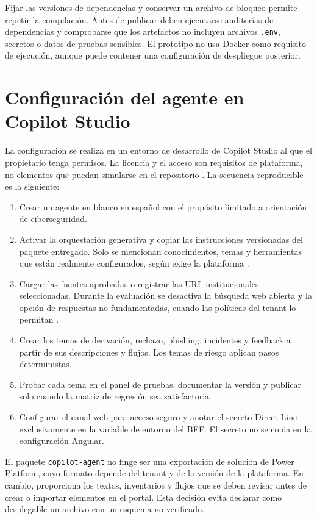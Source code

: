 \documentclass[12pt,twoside,titlepage]{book}
\begin{document}
Fijar las versiones de dependencias y conservar un archivo de bloqueo permite repetir la compilaci\'on. Antes de publicar deben ejecutarse auditor\'ias de dependencias y comprobarse que los artefactos no incluyen archivos \texttt{.env}, secretos o datos de pruebas sensibles. El prototipo no usa Docker como requisito de ejecuci\'on, aunque puede contener una configuraci\'on de despliegue posterior.

\section{Configuraci\'on del agente en Copilot Studio}

La configuraci\'on se realiza en un entorno de desarrollo de Copilot Studio al que el propietario tenga permisos. La licencia y el acceso son requisitos de plataforma, no elementos que puedan simularse en el repositorio \cite{copilotLicensing}. La secuencia reproducible es la siguiente:

\begin{enumerate}[label=\arabic*.]
  \item Crear un agente en blanco en espa\~nol con el prop\'osito limitado a orientaci\'on de ciberseguridad.
  \item Activar la orquestaci\'on generativa y copiar las instrucciones versionadas del paquete entregado. Solo se mencionan conocimientos, temas y herramientas que est\'an realmente configurados, seg\'un exige la plataforma \cite{copilotInstructions}.
  \item Cargar las fuentes aprobadas o registrar las URL institucionales seleccionadas. Durante la evaluaci\'on se desactiva la b\'usqueda web abierta y la opci\'on de respuestas no fundamentadas, cuando las pol\'iticas del tenant lo permitan \cite{copilotKnowledge}.
  \item Crear los temas de derivaci\'on, rechazo, phishing, incidentes y feedback a partir de sus descripciones y flujos. Los temas de riesgo aplican pasos deterministas.
  \item Probar cada tema en el panel de pruebas, documentar la versi\'on y publicar solo cuando la matriz de regresi\'on sea satisfactoria.
  \item Configurar el canal web para acceso seguro y anotar el secreto Direct Line exclusivamente en la variable de entorno del BFF. El secreto no se copia en la configuraci\'on Angular.
\end{enumerate}

El paquete \texttt{copilot-agent} no finge ser una exportaci\'on de soluci\'on de Power Platform, cuyo formato depende del tenant y de la versi\'on de la plataforma. En cambio, proporciona los textos, inventarios y flujos que se deben revisar antes de crear o importar elementos en el portal. Esta decisi\'on evita declarar como desplegable un archivo con un esquema no verificado.
\end{document}
